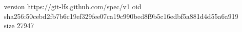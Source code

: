 version https://git-lfs.github.com/spec/v1
oid sha256:50cebd2fb7b6c19ef329fee07ca19c990bed8f9b5c16edbf5a881d4d55a6a919
size 27947
